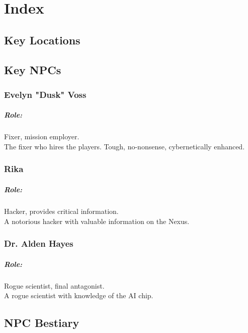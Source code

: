 \chapter{Index}
\label{ch:index}
\section{Key Locations}

\section{Key NPCs}
\subsection{Evelyn "Dusk" Voss}
\label{char:dusk}
\paragraph{Role:}
Fixer, mission employer.
\\%
The fixer who hires the players. Tough, no-nonsense, cybernetically enhanced.
\subsection{Rika}
\label{char:rika}
\paragraph{Role:}
Hacker, provides critical information.
\\%
A notorious hacker with valuable information on the Nexus.
\subsection{Dr. Alden Hayes}
\label{char:hayes}
\paragraph{Role:}
Rogue scientist, final antagonist.
\\%
A rogue scientist with knowledge of the AI chip.

\section{NPC Bestiary}

